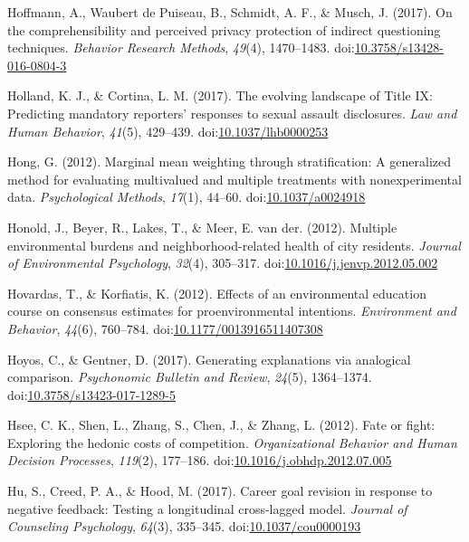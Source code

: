 \documentclass[english,man]{apa6}
\theoremstyle{definition}
\theoremstyle{definition}
\theoremstyle{definition}
\theoremstyle{remark}
\begin{document}
\hypertarget{ref-Hoffmann2016}{}
Hoffmann, A., Waubert de Puiseau, B., Schmidt, A. F., \& Musch, J.
(2017). On the comprehensibility and perceived privacy protection of
indirect questioning techniques. \emph{Behavior Research Methods},
\emph{49}(4), 1470--1483.
doi:\href{https://doi.org/10.3758/s13428-016-0804-3}{10.3758/s13428-016-0804-3}

\hypertarget{ref-Holland2017}{}
Holland, K. J., \& Cortina, L. M. (2017). The evolving landscape of
Title IX: Predicting mandatory reporters' responses to sexual assault
disclosures. \emph{Law and Human Behavior}, \emph{41}(5), 429--439.
doi:\href{https://doi.org/10.1037/lhb0000253}{10.1037/lhb0000253}

\hypertarget{ref-Hong2012}{}
Hong, G. (2012). Marginal mean weighting through stratification: A
generalized method for evaluating multivalued and multiple treatments
with nonexperimental data. \emph{Psychological Methods}, \emph{17}(1),
44--60. doi:\href{https://doi.org/10.1037/a0024918}{10.1037/a0024918}

\hypertarget{ref-Honold2012}{}
Honold, J., Beyer, R., Lakes, T., \& Meer, E. van der. (2012). Multiple
environmental burdens and neighborhood-related health of city residents.
\emph{Journal of Environmental Psychology}, \emph{32}(4), 305--317.
doi:\href{https://doi.org/10.1016/j.jenvp.2012.05.002}{10.1016/j.jenvp.2012.05.002}

\hypertarget{ref-Hovardas2012}{}
Hovardas, T., \& Korfiatis, K. (2012). Effects of an environmental
education course on consensus estimates for proenvironmental intentions.
\emph{Environment and Behavior}, \emph{44}(6), 760--784.
doi:\href{https://doi.org/10.1177/0013916511407308}{10.1177/0013916511407308}

\hypertarget{ref-Hoyos2017}{}
Hoyos, C., \& Gentner, D. (2017). Generating explanations via analogical
comparison. \emph{Psychonomic Bulletin and Review}, \emph{24}(5),
1364--1374.
doi:\href{https://doi.org/10.3758/s13423-017-1289-5}{10.3758/s13423-017-1289-5}

\hypertarget{ref-Hsee2012}{}
Hsee, C. K., Shen, L., Zhang, S., Chen, J., \& Zhang, L. (2012). Fate or
fight: Exploring the hedonic costs of competition. \emph{Organizational
Behavior and Human Decision Processes}, \emph{119}(2), 177--186.
doi:\href{https://doi.org/10.1016/j.obhdp.2012.07.005}{10.1016/j.obhdp.2012.07.005}

\hypertarget{ref-Hu2017}{}
Hu, S., Creed, P. A., \& Hood, M. (2017). Career goal revision in
response to negative feedback: Testing a longitudinal cross-lagged
model. \emph{Journal of Counseling Psychology}, \emph{64}(3), 335--345.
doi:\href{https://doi.org/10.1037/cou0000193}{10.1037/cou0000193}
\end{document}
